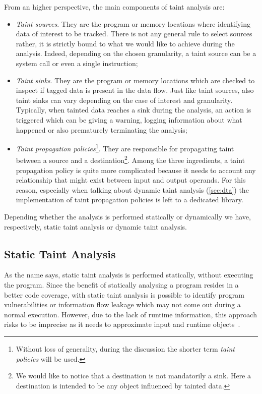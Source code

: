 \documentclass[LaM,binding=0.6cm]{sapthesis}
\begin{document}
From an higher perspective, the main components of taint analysis are: 
\begin{itemize}
\item \textit{Taint sources}. They are the program or memory locations where identifying data of interest to be tracked. There is not any general rule to select sources rather, it is strictly bound to what we would like to achieve during the analysis. Indeed, depending on the chosen granularity, a taint source can be a system call or even a single instruction;
\item \textit{Taint sinks}. They are the program or memory locations which are checked to inspect if tagged data is present in the data flow. Just like taint sources, also taint sinks can vary depending on the case of interest and granularity. Typically, when tainted data reaches a sink during the analysis, an action is triggered which can be giving a warning, logging information about what happened or also prematurely terminating the analysis;
\item \textit{Taint propagation policies}\footnote{Without loss of generality, during the discussion the shorter term \textit{taint policies} will be used.}. They are responsible for propagating taint between a source and a destination\footnote{We would like to notice that a destination is not mandatorily a sink. Here a destination is intended to be any object influenced by tainted data.}. Among the three ingredients, a taint propagation policy is quite more complicated because it needs to account any relationship that might exist between input and output operands. For this reason, especially when talking about dynamic taint analysis (\autoref{sec:dta}) the implementation of taint propagation policies is left to a dedicated library.
\end{itemize}
Depending whether the analysis is performed statically or dynamically we have, respectively, static taint analysis or dynamic taint analysis.

\subsection{Static Taint Analysis}
As the name says, static taint analysis is performed statically, without executing the program. Since the benefit of statically analysing a program resides in a better code coverage, with static taint analysis is possible to identify program vulnerabilities or information flow leakage which may not come out during a normal execution. However, due to the lack of runtime information, this approach risks to be imprecise as it needs to approximate input and runtime objects~\cite{arzt2014flowdroid}.
\end{document}
